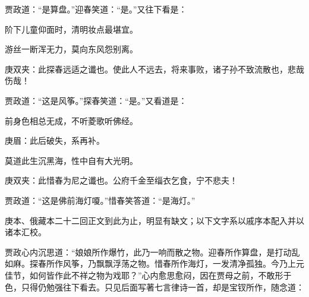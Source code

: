 \begin{parag}
    贾政道：“是算盘。”迎春笑道：“是。”又往下看是：
\end{parag}


\begin{poem}
    \begin{pl}阶下儿童仰面时，清明妆点最堪宜。\end{pl}

    \begin{pl}游丝一断浑无力，莫向东风怨别离。\end{pl}
    \begin{note}庚双夹：此探春远适之谶也。使此人不远去，将来事败，诸子孙不致流散也，悲哉伤哉！\end{note}
\end{poem}


\begin{parag}
    贾政道：“这是风筝。”探春笑道：“是。”又看道是：
\end{parag}


\begin{poem}
    \begin{pl}前身色相总无成，不听菱歌听佛经。\end{pl}
    \begin{note}庚眉：此后破失，系再补。\end{note}

    \begin{pl}莫道此生沉黑海，性中自有大光明。\end{pl}
    \begin{note}庚双夹：此惜春为尼之谶也。公府千金至缁衣乞食，宁不悲夫！ \end{note}
\end{poem}


\begin{parag}
    贾政道：“这是佛前海灯嗄。”惜春笑答道：“是海灯。”
\end{parag}


\begin{note}
    庚本、俄藏本二十二回正文到此为止，明显有缺文；以下文字系以戚序本配入并以诸本汇校。
\end{note}


\begin{parag}
    贾政心内沉思道：“娘娘所作爆竹，此乃一响而散之物。迎春所作算盘，是打动乱如麻。探春所作风筝，乃飘飘浮荡之物。惜春所作海灯，一发清净孤独。今乃上元佳节，如何皆作此不祥之物为戏耶？”心内愈思愈闷，因在贾母之前，不敢形于色，只得仍勉强往下看去。只见后面写著七言律诗一首，却是宝钗所作，随念道：
\end{parag}


